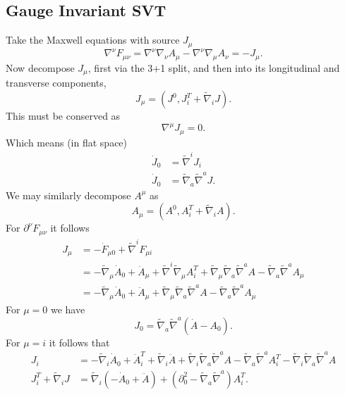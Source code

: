 \documentclass[10pt,letterpaper]{article}
\numberwithin{equation}{subsection}
\begin{document}
\subsection{Gauge Invariant SVT}
Take the Maxwell equations with source $J_{\mu}$
\begin{equation}
	\nabla^\nu F_{\mu\nu} = \nabla ^\nu\nabla_\nu A_\mu - \nabla^\nu \nabla_\mu A_\nu =  -J_\mu.
\end{equation}
Now decompose $J_{\mu}$, first via the 3+1 split, and then into its longitudinal and transverse components, 
\begin{equation}
J_{\mu} = (J^0, J_i^T+ \tilde\nabla_i J).
\end{equation}
This must be conserved as
\begin{equation}
 \nabla^\mu J_{\mu} = 0.
\end{equation}
Which means (in flat space)
\begin{align}
\dot J_0 &= \tilde\nabla^i J_i\\
\dot J_0&= \tilde\nabla_a \tilde\nabla^a J.
\end{align}
We may similarly decompose $A^\mu$ as
\begin{equation}
A_\mu = (A^0, A_i^T + \tilde\nabla_i A).
\end{equation}
For $\partial^\nu F_{\mu\nu}$ it follows
\begin{align}
J_\mu &= -\dot F_{\mu 0} + \tilde\nabla^i F_{\mu i}
\nonumber \\
&=  - \tilde\nabla_\mu \dot A_0 + \ddot A_\mu + \tilde\nabla^i \tilde\nabla_\mu A_i^T + \tilde\nabla_\mu \tilde\nabla_a\tilde\nabla^a A  - \tilde\nabla_a \tilde\nabla^a A_\mu
\nonumber \\
&= - \tilde\nabla_\mu \dot A_0 + \ddot A_\mu  + \tilde\nabla_\mu \tilde\nabla_a\tilde\nabla^a A  - \tilde\nabla_a \tilde\nabla^a A_\mu
\end{align}
For $\mu = 0$ we have
\begin{equation}
J_0 = \tilde\nabla_a \tilde\nabla^a\left( \dot A - A_0\right ).
\end{equation}
For $\mu = i$ it follows that
\begin{align}
J_i &= -\tilde\nabla_i \dot A_0 + \ddot A_i^T + \tilde\nabla_i \ddot A + \tilde\nabla_i \tilde\nabla_a\tilde\nabla^a A - \tilde\nabla_a\tilde\nabla^a A_i^T - \tilde\nabla_i \tilde\nabla_a\tilde\nabla^a A
\nonumber\\
J_i^T + \tilde\nabla_i J &= \tilde\nabla_i \left( -\dot A_0 + \ddot A\right) + \left(\partial_0^2 - \tilde\nabla_a\tilde\nabla^a\right)A_i^T.
\end{align}
\end{document}
